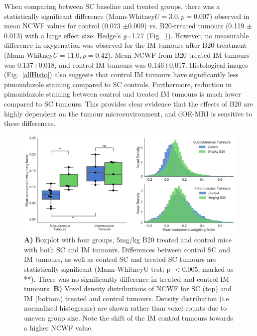 When comparing between \acs{SC} baseline and treated groups, there was a statistically significant difference (Mann-Whitney$U = 3.0, p = 0.007$) observed in mean \acs{NCWF} values for control (0.073 $\pm$0.009) vs. B20-treated tumours (0.119 $\pm$0.013) with a large effect size: Hedge's \emph{g}=1.77 (Fig.~\ref{OEP8boxplot}).
However, no measurable difference in oxygenation was observed for the \acs{IM} tumours after B20 treatment (Mann-Whitney$U = 11.0, p = 0.42$).
Mean \acs{NCWF} from B20-treated \acs{IM} tumours was 0.137$\pm$0.018, and control \acs{IM} tumours was 0.146$\pm$0.017. 
Histological images (Fig.~\ref{allHisto}) also suggests that control \acs{IM} tumours have significantly less pimonidazole staining compared to \acs{SC} controls.
Furthermore, reduction in pimonidazole staining between control and treated \acs{IM} tumours is much lower compared to \acs{SC} tumours.
This provides clear evidence that the effects of B20 are highly dependent on the tumour microenvironment, and \acs{dOE-MRI} is sensitive to these differences.

\begin{figure}[htbp]
   \centering
   \includegraphics[width=\textwidth]{oemri_thesis3/oemri_thesis3-images/4_oep8_IMSC_b20_sanitized_dOEMRI.png} %
   \caption{\textbf{A)} Boxplot with four groups, 5mg/kg B20 treated and control mice with both \acs{SC} and \acs{IM} tumours.
   Differences between control \acs{SC} and \acs{IM} tumours, as well as control \acs{SC} and treated \acs{SC} tumours are statistically significant (Mann-WhitneyU test; p $<$0.005, marked as **).
   There was no significantly difference in treated and control \acs{IM} tumours.
   \textbf{B)} Voxel density distributions of \acs{NCWF} for \acs{SC} (top) and \acs{IM} (bottom) treated and control tumours.
   Density distribution (i.e. normalized histograms) are shown rather than voxel counts due to uneven group size. 
   Note the shift of the \acs{IM} control tumours towards a higher \acs{NCWF} value.}
   \label{OEP8boxplot}
\end{figure}

